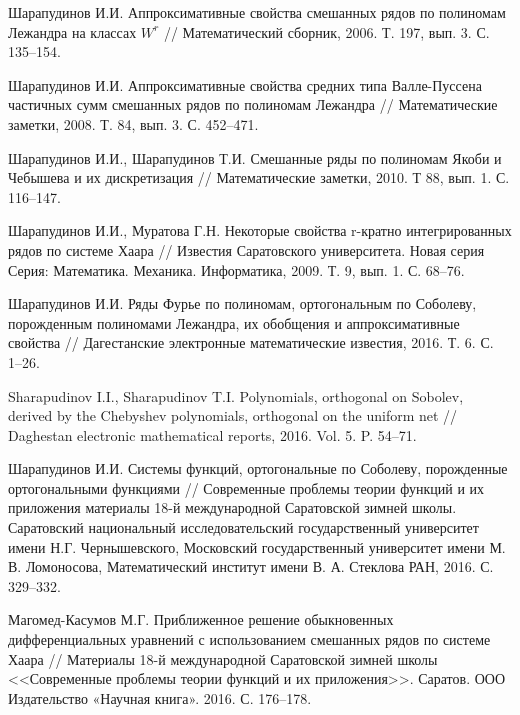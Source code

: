\begin{thebibliography}{1} %



 Шарапудинов И.И. Аппроксимативные свойства смешанных рядов по полиномам Лежандра на классах $W^r$ // Математический сборник, 2006. Т. 197, вып. 3. С. 135--154.

 Шарапудинов И.И. Аппроксимативные свойства средних типа Валле-Пуссена частичных сумм смешанных рядов по полиномам Лежандра // Математические заметки, 2008. Т. 84, вып. 3. С. 452--471.

 Шарапудинов И.И., Шарапудинов Т.И.  Смешанные ряды по полиномам Якоби и Чебышева и их дискретизация // Математические заметки, 2010. Т 88, вып. 1. С. 116--147.

 Шарапудинов И.И.,  Муратова Г.Н. Некоторые свойства r-кратно интегрированных рядов по системе Хаара // Известия Саратовского университета. Новая серия Серия: Математика. Механика. Информатика, 2009. Т. 9, вып. 1. С. 68--76.

 Шарапудинов И.И. Ряды Фурье по полиномам, ортогональным по Соболеву, порожденным полиномами Лежандра, их обобщения и аппроксимативные свойства // Дагестанские электронные математические известия, 2016. Т. 6. С. 1--26.

 Sharapudinov I.I., Sharapudinov T.I. Polynomials, orthogonal on Sobolev, derived by the Chebyshev polynomials, orthogonal on the uniform net // Daghestan electronic mathematical reports, 2016. Vol. 5. P. 54--71.

 Шарапудинов И.И. Системы функций, ортогональные по Соболеву, порожденные ортогональными функциями // Современные проблемы теории функций и их приложения материалы 18-й международной Саратовской зимней школы. Саратовский национальный исследовательский государственный университет имени Н.Г. Чернышевского, Московский государственный университет имени М. В. Ломоносова, Математический институт имени В. А. Стеклова РАН, 2016. С. 329--332.

 Магомед-Касумов М.Г. Приближенное решение обыкновенных дифференциальных уравнений с использованием смешанных рядов по системе Хаара // Материалы 18-й международной Саратовской зимней школы <<Современные проблемы теории функций и их приложения>>. Саратов. ООО Издательство «Научная книга». 2016. С. 176--178.


\end{thebibliography}
